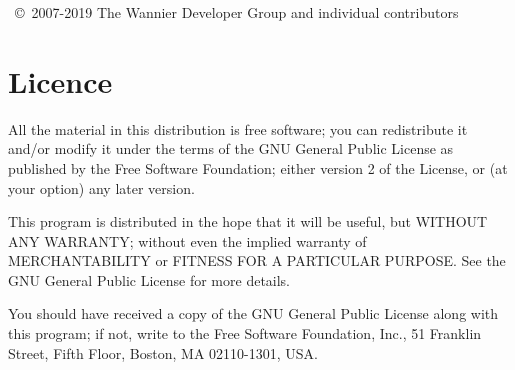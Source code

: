 \wannier\ \copyright\ 2007-2019 The Wannier Developer Group and individual contributors

\section*{Licence}
All the material in this distribution is free software; you can
redistribute it and/or 
modify it under the terms of the GNU General Public License
as published by the Free Software Foundation; either version 2
of the License, or (at your option) any later version.

This program is distributed in the hope that it will be useful,
but WITHOUT ANY WARRANTY; without even the implied warranty of
MERCHANTABILITY or FITNESS FOR A PARTICULAR PURPOSE.  See the
GNU General Public License for more details.

You should have received a copy of the GNU General Public License
along with this program; if not, write to the Free Software
Foundation, Inc., 51 Franklin Street, Fifth Floor, Boston, MA  02110-1301, USA.


 
